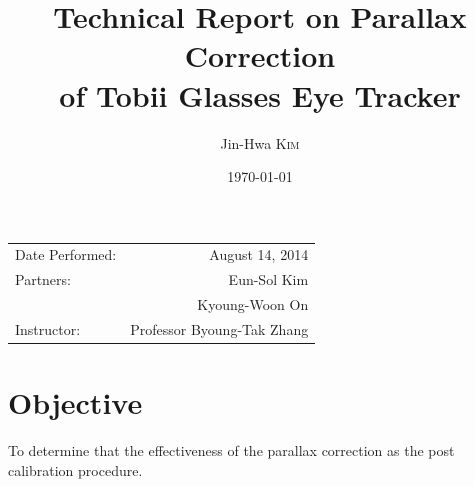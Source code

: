 \documentclass{article}
\title{Technical Report on Parallax Correction \\
of Tobii Glasses Eye Tracker} %
\author{Jin-Hwa \textsc{Kim}} %
\date{\today} %
\begin{document}
\maketitle %

\begin{center}
\begin{tabular}{l r}
Date Performed: & August 14, 2014 \\ %
Partners: & Eun-Sol Kim \\ %
& Kyoung-Woon On \\
Instructor: & Professor Byoung-Tak Zhang %
\end{tabular}
\end{center}



\section{Objective}

To determine that the effectiveness of the parallax correction as the post calibration procedure. 

\end{document}

